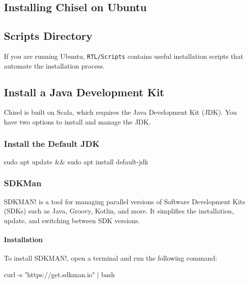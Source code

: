 
\subsection{Installing Chisel on Ubuntu}

\subsection{Scripts Directory}
If you are running Ubuntu, {\tt RTL/Scripts} contains useful installation scripts that automate the installation process.


\subsection{Install a Java Development Kit}
Chisel is built on Scala, which requires the Java Development Kit (JDK). You have two options to install and manage the JDK.

\subsubsection{Install the Default JDK}
\begin{bashcode}
sudo apt update && sudo apt install default-jdk
\end{bashcode}

\subsubsection{SDKMan}

SDKMAN! is a tool for managing parallel versions of Software Development Kits (SDKs) such as Java, Groovy, Kotlin, and more. It simplifies the installation, update, and switching between SDK versions.

\paragraph*{Installation}

To install SDKMAN!, open a terminal and run the following command:
\begin{bashcode}
     curl -s "https://get.sdkman.io" | bash       
\end{bashcode}


